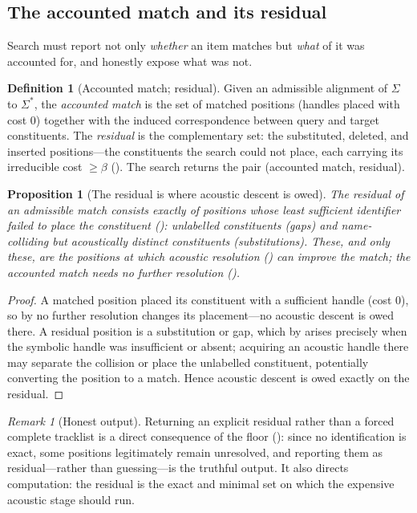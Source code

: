 \documentclass[11pt,twocolumn,a4paper]{article}
\theoremstyle{thmstyle}
\newtheorem{proposition}[theorem]{Proposition}
\theoremstyle{definition}
\newtheorem{definition}[theorem]{Definition}
\theoremstyle{remark}
\newtheorem{remark}[theorem]{Remark}
\newcommand{\flo}{\beta}
\newcommand{\sig}{\Sigma}
\begin{document}
\subsection{The accounted match and its residual}

Search must report not only \emph{whether} an item matches but \emph{what} of it
was accounted for, and honestly expose what was not.

\begin{definition}[Accounted match; residual]
\label{def:accounted}
Given an admissible alignment of $\sig$ to $\sig^{\ast}$, the \emph{accounted
match} is the set of matched positions (handles placed with cost $0$) together
with the induced correspondence between query and target constituents. The
\emph{residual} is the complementary set: the substituted, deleted, and inserted
positions---the constituents the search could not place, each carrying its
irreducible cost $\ge\flo$ (). The search returns the pair
(accounted match, residual).
\end{definition}

\begin{proposition}[The residual is where acoustic descent is owed]
\label{prop:residual}
The residual of an admissible match consists exactly of positions whose least
sufficient identifier failed to place the constituent ():
unlabelled constituents (gaps) and name-colliding but acoustically distinct
constituents (substitutions). These, and only these, are the positions at which
acoustic resolution () can improve the match; the accounted
match needs no further resolution ().
\end{proposition}

\begin{proof}
A matched position placed its constituent with a sufficient handle (cost $0$),
so by  no further resolution changes its placement---no
acoustic descent is owed there. A residual position is a substitution or gap,
which by  arises precisely when the symbolic handle was
insufficient or absent; acquiring an acoustic handle there may separate the
collision or place the unlabelled constituent, potentially converting the
position to a match. Hence acoustic descent is owed exactly on the residual.
\end{proof}

\begin{remark}[Honest output]
\label{rem:honest}
Returning an explicit residual rather than a forced complete tracklist is a
direct consequence of the floor (): since no identification is
exact, some positions legitimately remain unresolved, and reporting them as
residual---rather than guessing---is the truthful output. It also directs
computation: the residual is the exact and minimal set on which the expensive
acoustic stage should run.
\end{remark}
\end{document}
